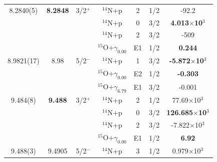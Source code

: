 \begin{table}[]
\begin{center}
\begin{threeparttable}
\begin{tabular}{c  c  c  c  c  c  c}
8.2840(5)& \textbf{8.2848}&	3/2$^+$	&	$^{14}$N+p	&	2	&	1/2	&	{-92.2}\\
	&	&	&	$^{14}$N+p	&	0	&	3/2	&	\textbf{4.013$\times$10$^3$}\\
	&	&	&	$^{14}$N+p	&	2	&	3/2	&	{-509}\\
	&	&	&	$^{15}$O+$\gamma_{0.00}$	&	E1	&	1/2	&	\textbf{0.244}\\
8.9821(17) & {8.98}&	5/2$^-$	&	$^{14}$N+p	&	1	&	3/2	&	\textbf{-5.872$\times$10$^3$}\\
	&	&	&	$^{15}$O+$\gamma_{0.00}$	&	E2	&	1/2	&	\textbf{-0.303}\\
	&	&	&	$^{15}$O+$\gamma_{6.79}$	&	E1	&	3/2	&	{-0.001}\\
9.484(8) & \textbf{9.488}&	3/2$^+$	&	$^{14}$N+p	&	2	&	1/2	&	{77.69$\times$10$^3$}	\\
	&	&	&	$^{14}$N+p	&	0	&	3/2	&	\textbf{126.685$\times$10$^3$}	\\
	&	&	&	$^{14}$N+p	&	2	&	3/2	&	{-7.822$\times$10$^3$}\\
	&	&	&	$^{15}$O+$\gamma_{0.00}$	&	E1	&	1/2	&	\textbf{6.92}\\
9.488(3) & {9.4905}&	5/2$^-$	&	$^{14}$N+p	&	3	&	1/2	&	{0.979$\times$10$^3$}\\

\end{tabular}
\end{threeparttable}
\end{center}
\end{table}
